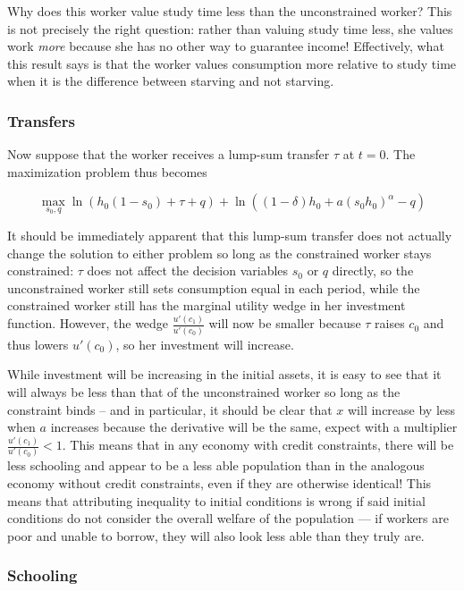 \documentclass[12pt, letterpaper, parskip = full]{article}
\begin{document}
    Why does this worker value study time less than the unconstrained worker? This is not precisely the right question: rather than valuing study time less, she values work \emph{more} because she has no other way to guarantee income! Effectively, what this result says is that the worker values consumption more relative to study time when it is the difference between starving and not starving.

    \subsubsection{Transfers}

    Now suppose that the worker receives a lump-sum transfer \(\tau\) at \(t = 0\). The maximization problem thus becomes 

    \[ \max_{s_0, q} \ln\left(h_0(1-s_0) + \tau + q\right) + \ln\left((1-\delta) h_0 + a (s_0 h_0)^\alpha - q\right) \] 

    It should be immediately apparent that this lump-sum transfer does not actually change the solution to either problem so long as the constrained worker stays constrained: \(\tau\) does not affect the decision variables \(s_0\) or \(q\) directly, so the unconstrained worker still sets consumption equal in each period, while the constrained worker still has the marginal utility wedge in her investment function. However, the wedge \(\frac{u'(c_1)}{u'(c_0)}\) will now be smaller because \(\tau\) raises \(c_0\) and thus lowers \(u'(c_0)\), so her investment will increase. 

    While investment will be increasing in the initial assets, it is easy to see that it will always be less than that of the unconstrained worker so long as the constraint binds -- and in particular, it should be clear that \(x\) will increase by less when \(a\) increases because the derivative will be the same, expect with a multiplier \(\frac{u'(c_1)}{u'(c_0)} < 1\). This means that in any economy with credit constraints, there will be less schooling and appear to be a less able population than in the analogous economy without credit constraints, even if they are otherwise identical! This means that attributing inequality to initial conditions is wrong if said initial conditions do not consider the overall welfare of the population --- if workers are poor and unable to borrow, they will also look less able than they truly are.

    \subsubsection{Schooling}
\end{document}
